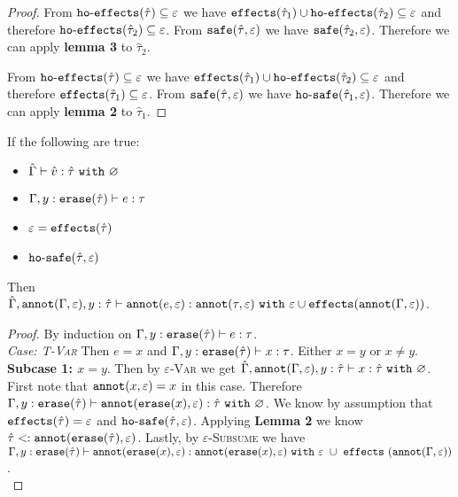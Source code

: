\begin{appendix}
\begin{proof}
From $\mathtt{ho \hbox{-} effects}(\hat \tau) \subseteq \varepsilon$ we have $\mathtt{effects}(\hat \tau_1) \cup \mathtt{ho \hbox{-} effects}(\hat \tau_2) \subseteq \varepsilon$ and therefore $\mathtt{ho \hbox{-} effects}(\hat \tau_2) \subseteq \varepsilon$. From $\mathtt{safe}(\hat \tau, \varepsilon)$ we have $\mathtt{safe}(\hat \tau_2, \varepsilon)$. Therefore we can apply \textbf{lemma 3} to $\hat \tau_2$.

From $\mathtt{ho \hbox{-} effects}(\hat \tau) \subseteq \varepsilon$ we have $\mathtt{effects}(\hat \tau_1) \cup \mathtt{ho \hbox{-} effects}(\hat \tau_2) \subseteq \varepsilon$ and therefore $\mathtt{effects}(\hat \tau_1) \subseteq \varepsilon$. From $\mathtt{safe}(\hat \tau, \varepsilon)$ we have $\mathtt{ho \hbox{-} safe}(\hat \tau_1, \varepsilon)$. Therefore we can apply \textbf{lemma 2} to $\hat \tau_1$.

\end{proof}


\hrulefill

\begin{lemma}[Annotation]
If the following are true:

\begin{itemize}
	\setlength\itemsep{-0.7em}
	\item $\hat \Gamma \vdash \hat v : \hat \tau~\mathtt{with}~ \varnothing$
	\item $\Gamma, y: \mathtt{erase}(\hat \tau) \vdash e: \tau$
	\item $\varepsilon = \mathtt{effects}(\hat \tau)$
	\item $\mathtt{ho \hbox{-} safe}(\hat \tau, \varepsilon)$
\end{itemize}

\noindent
Then $\hat \Gamma, \mathtt{annot}(\Gamma, \varepsilon), y: \hat \tau \vdash \mathtt{annot}(e, \varepsilon) : \mathtt{annot}(\tau, \varepsilon)~\mathtt{with}~ \varepsilon \cup \mathtt{effects}(\mathtt{annot}(\Gamma, \varepsilon))$.
\end{lemma}

\begin{proof}
By induction on $\Gamma, y: \mathtt{erase}(\hat \tau) \vdash e: \tau$.\\

\textit{Case: \textsc{T-Var}} Then $e=x$ and $\Gamma, y: \mathtt{erase}(\hat \tau) \vdash x: \tau$. Either $x=y$ or $x \neq y$. \\

\textbf{Subcase 1: $x = y$}. Then by \textsc{$\varepsilon$-Var} we get $\hat \Gamma, \mathtt{annot}(\Gamma, \varepsilon), y: \hat \tau \vdash x: \hat \tau~\mathtt{with}~ \varnothing$. First note that $\mathtt{annot}(x, \varepsilon) = x$ in this case. Therefore $\Gamma, y: \mathtt{erase}(\hat \tau) \vdash \mathtt{annot}(\mathtt{erase}(x), \varepsilon): \hat \tau~\mathtt{with}~ \varnothing$. We know by assumption that $\mathtt{effects}(\hat \tau) = \varepsilon$ and $\mathtt{ho \hbox{-} safe}(\hat \tau, \varepsilon)$. Applying \textbf{Lemma 2} we know $\hat \tau <: \mathtt{annot}(\mathtt{erase}(\hat \tau), \varepsilon)$. Lastly, by \textsc{$\varepsilon$-Subsume} we have $\Gamma, y: \mathtt{erase}(\hat \tau) \vdash \mathtt{annot}(\mathtt{erase}(x), \varepsilon): \mathtt{annot}(\mathtt{erase}(x), \varepsilon)~\mathtt{with}~ \varepsilon~\cup~\mathtt{effects}~(\mathtt{annot}(\Gamma, \varepsilon))$. \\


\end{proof}
\end{appendix}
